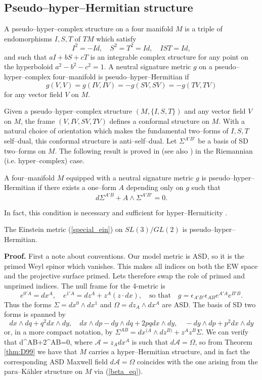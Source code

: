 \subsection{Pseudo--hyper--Hermitian structure}
A pseudo--hyper--complex structure on a four manifold $M$ is a triple of endomorphisms
$I, S, T$ of $TM$ which satisfy
\[
I^2=-Id, \quad S^2=T^2=Id, \quad IST=Id,
\]
and such that $aI+bS+cT$ is an integrable complex structure for any point 
on the hyperboloid $a^2-b^2-c^2=1$.
A neutral signature metric $g$ on a pseudo--hyper--complex four--manifold is pseudo--hyper--Hermitian
if
\[
g(V, V)=g(IV, IV)=-g(SV, SV)=-g(TV, TV)
\]
for any vector field $V$ on $M$.

Given a pseudo--hyper--complex structure $(M,\{I,S,T\})$ and any vector field $V$ on $M$, the frame $(V,IV,SV,TV)$ defines a conformal structure on $M$. With a natural choice of orientation
which makes the fundamental two--forms of $I, S, T$  self--dual, 
this conformal structure is anti--self--dual. 
Let $\Sigma^{A'B'}$ be a basis of SD two--forms on $M$. The following result is proved in \cite{D99} (see also \cite{boyer}) in the Riemannian (i.e. hyper--complex) case.
\begin{theo}[\cite{D99}]\label{thm:D99}
A four--manifold $M$ equipped with a neutral signature metric $g$ is pseudo--hyper--Hermitian if there exists a one--form $A$ depending only on $g$ such that
\[
d\Sigma^{A'B}+A\wedge \Sigma^{A'B'} = 0.
\]
\end{theo}
\noindent In fact, this condition is necessary and sufficient for hyper--Hermiticity \cite{D99,boyer}.
\begin{prop}
\label{propHH}
The Einstein metric (\ref{special_ein}) on $SL(3)/GL(2)$ is pseudo--hyper--Hermitian.
\end{prop}
\noindent
{\bf Proof.}
First a note about conventions.
Our model metric is ASD, so it is the primed Weyl spinor which vanishes. This makes all indices on both the EW space and the projective surface primed. Lets therefore swap the role of primed and unprimed indices. The null frame for the 4-metric is
\[
e^{0'A}=dx^A, \quad e^{1'A}=dz^A+z^A(z\cdot dx), \quad\mbox{so that}\quad
g=\epsilon_{A'B'}\epsilon_{AB}e^{A'A}e^{B'B}.
\]
Thus the forms $\Sigma=dx^0\wedge dx^1$ and $\Omega=dz_A\wedge dx^A$ are ASD. The basis of SD two forms is spanned by
\[
dx\wedge dq+ q^2 dx\wedge dy,\quad
dx\wedge dp-dy\wedge dq+2 pq dx\wedge dy,
\quad
-dy\wedge dp+ p^2 dx\wedge dy
\]
or, in a more compact notation, by
$\Sigma^{AB}=dx^{(A}\wedge dz^{B)}+z^Az^B \Sigma$.
We can verify that
\be
\label{lie_form}
d\Sigma^{AB}+2{{}}\wedge\Sigma^{AB}=0,
\ee
where ${{\mathcal A}}= z_Adx^A$ is such that $d{{\mathcal{A}}}= \Omega$,
so from Theorem \ref{thm:D99} we have that $M$ carries a hyper--Hermitian structure, and in fact the corresponding ASD Maxwell field $d\mathcal{A}=\Omega$ coincides with the one arising from the para--K\"ahler structure on $M$ via (\ref{beta_eq}).


